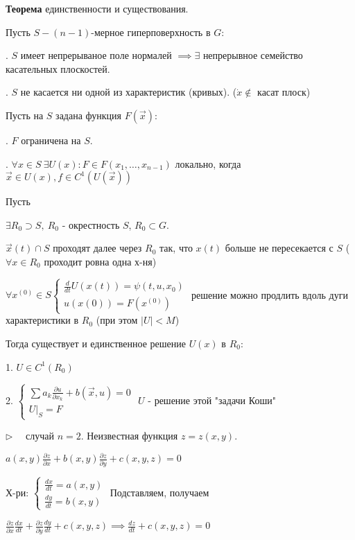 \documentclass[12pt, a4paper]{article}
\begin{document}
    \textbf{Теорема} единственности и существования. 
    
    Пусть $S - (n-1)$-мерное гиперповерхность в $G$:

    . $S$ имеет непрерываное поле нормалей $\implies \exists$ непрерывное семейство касательных плоскостей.

    . $S$ не касается ни одной из характеристик (кривых). ($\dot x \notin $ касат плоск)

    Пусть на $S$ задана функция $F(\vec x):$
    
    . $F$ ограничена на $S$.

    . $\forall x \in S \ \exists U(x): F \in F(x_1, \dotsc, x_{n-1})$ локально, когда $\vec x \in U(x), f\in C^1(U(\vec x))$

    Пусть 

     $\exists R_0 \supset S, \ R_0$ - окрестность $S$, $R_0 \subset G$.

     $\vec x (t)\cap S$ проходят далее через $R_0$ так, что $x(t)$ больше не пересекается с $S$ ($\forall x \in R_0$ проходит ровна одна х-ня)

     $\forall x^{(0)} \in S \begin{cases}
        \frac{d}{dt} U(x(t)) = \psi(t, u, x_0) \\ u(x(0)) = F(x^{(0)})
    \end{cases}$ решение можно продлить вдоль дуги характеристики в $R_0$ (при этом $|U| < M$)

    Тогда существует и единственное решение $U(x)$ в $R_0$: 

    1. $U \in C^1(R_0)$

    2. $\begin{cases}
        \sum a_k \frac{\partial u}{\partial x_k} + b(\vec x, u) = 0 \\ U|_S = F
    \end{cases}$ $U$ - решение этой "задачи Коши"

    $\triangleright\quad $ случай $n=2$. Неизвестная функция $z = z(x,y)$. 

    $a(x,y)\frac{\partial z}{\partial x} + b(x,y)\frac{\partial z}{\partial y} + c(x,y,z) = 0$

    Х-ри: $\begin{cases}
        \frac{dx}{dt} = a(x,y) \\ \frac{dy}{dt} = b(x,y) 
    \end{cases}$ Подставляем, получаем

    $\frac{\partial z}{\partial x}\frac{dx}{dt} + \frac{\partial z}{\partial y}\frac{dy}{dt} + c(x,y,z) \implies \frac{dz}{dt} + c(x,y,z) = 0$
\end{document}
